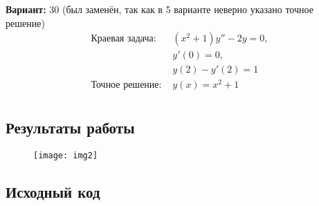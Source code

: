 {\bfseries Вариант:} 30 (был заменён, так как в 5 варианте неверно указано точное решение)
\begin{align*}
\text{Краевая задача: }
& (x^2 + 1) y'' - 2y = 0, \\
& y'(0) = 0,\\
& y(2) - y'(2) = 1 \\
\text{Точное решение: }
& y(x) = x^2 + 1 \\
\end{align*}
\pagebreak

\subsection{Результаты работы}
\begin{figure}[h!]
\centering
\texttt{[image: img2]}
\end{figure}
\pagebreak

\subsection{Исходный код}

\pagebreak
